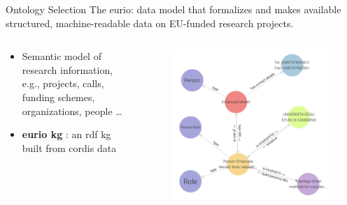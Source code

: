 \begin{tframe}{Ontology Selection}
The \gls{eurio}: data model that formalizes and makes available structured, machine-readable data on EU-funded research projects.

\begin{columns}
    \begin{column}{0.48\textwidth}
      \vspace{-.5cm}
        \begin{itemize}
            \item Semantic model of research information, e.g., projects, calls, funding schemes, organizations, people \ldots
            \vspace{.2cm}
            \item \textbf{\gls{eurio} \gls{kg}} \cite{CORDIS_EURIO_2022}: an \acrshort{rdf} \gls{kg} built from \gls{cordis} data
        \end{itemize}
    \end{column}
    \begin{column}{0.48\textwidth}
      \begin{figure}
        \centering
        \includegraphics[width=.95\linewidth]{../img/architecture/example-merelli.png}
      \end{figure}
    \end{column}
  \end{columns}

\end{tframe}